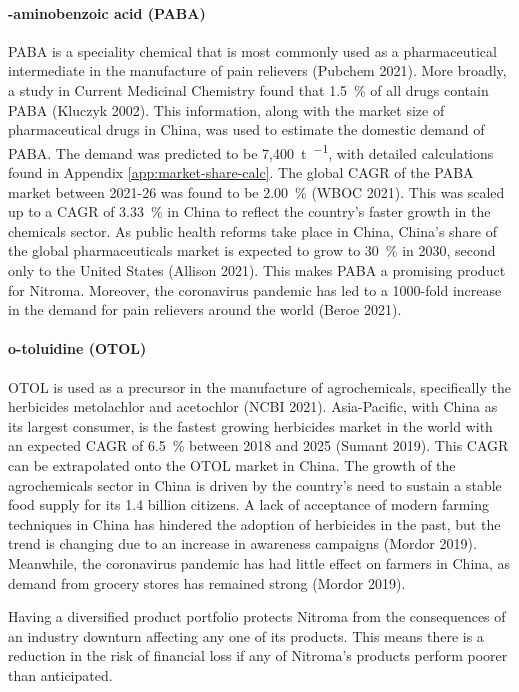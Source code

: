 \paragraph{\para-aminobenzoic acid (PABA)}
PABA is a speciality chemical that is most commonly used as a pharmaceutical intermediate in the manufacture of pain relievers (Pubchem 2021). More broadly, a study in Current Medicinal Chemistry found that \SI{1.5}{\percent} of all drugs contain PABA (Kluczyk 2002). This information, along with the market size of pharmaceutical drugs in China, was used to estimate the domestic demand of PABA. The demand was predicted to be 7,\SI{400}{\tonne\per\year}, with detailed calculations found in Appendix \ref{app:market-share-calc}. The global CAGR of the PABA market between 2021-26 was found to be \SI{2.00}{\percent} (WBOC 2021). This was scaled up to a CAGR of \SI{3.33}{\percent} in China to reflect the country’s faster growth in the chemicals sector. As public health reforms take place in China, China’s share of the global pharmaceuticals market is expected to grow to \SI{30}{\percent} in 2030, second only to the United States (Allison 2021). This makes PABA a promising product for Nitroma. Moreover, the coronavirus pandemic has led to a 1000-fold increase in the demand for pain relievers around the world (Beroe 2021).

\paragraph{o-toluidine (OTOL)}
OTOL is used as a precursor in the manufacture of agrochemicals, specifically the herbicides metolachlor and acetochlor (NCBI 2021). Asia-Pacific, with China as its largest consumer, is the fastest growing herbicides market in the world with an expected CAGR of \SI{6.5}{\percent} between 2018 and 2025 (Sumant 2019). This CAGR can be extrapolated onto the OTOL market in China. The growth of the agrochemicals sector in China is driven by the country’s need to sustain a stable food supply for its 1.4 billion citizens. A lack of acceptance of modern farming techniques in China has hindered the adoption of herbicides in the past, but the trend is changing due to an increase in awareness campaigns (Mordor 2019). Meanwhile, the coronavirus pandemic has had little effect on farmers in China, as demand from grocery stores has remained strong (Mordor 2019).

Having a diversified product portfolio protects Nitroma from the consequences of an industry downturn affecting any one of its products. This means there is a reduction in the risk of financial loss if any of Nitroma's products perform poorer than anticipated.

